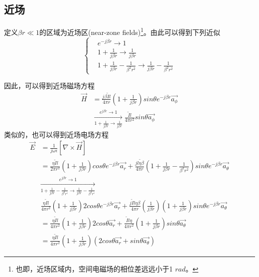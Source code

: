 \documentclass[lang=cn,11pt]{elegantpaper}
\begin{document}
\subsection{近场}
定义$\beta r \ll 1$的区域为近场区(near-zone fields)\footnote{也即，近场区域内，空间电磁场的相位差远远小于1 $rad$。}。由此可以得到下列近似
\begin{equation}
  \left\{\begin{aligned}
    & e^{-j\beta r}\rightarrow 1 \\
    & 1 + \frac{1}{j\beta r} \rightarrow \frac{1}{j\beta r} \\
    & 1 + \frac{1}{j\beta r} - \frac{1}{{\beta}^2 r^2} \rightarrow \frac{1}{j\beta r} - \frac{1}{{\beta}^2 r^2}
  \end{aligned}\right.
\end{equation}

因此，可以得到近场磁场方程
\begin{equation}
  \begin{aligned}
    \vec{H} &= \frac{j\beta \widetilde{I}l}{4\pi r}\left(1 + \frac{1}{j\beta r}\right)sin \theta {} e^{-j\beta r} \vec{a_{\phi}} \\
    &\xrightarrow[1 + \frac{1}{j\beta r}\rightarrow \frac{1}{j\beta r}]{e^{j\beta r}\rightarrow 1} \frac{\widetilde{I}l}{4\pi r^2}sin \theta \vec{a_{\phi}} 
  \end{aligned}
\end{equation}
类似的，也可以得到近场电场方程
\begin{equation}
  \begin{aligned}
    \vec{E} &= \frac{1}{j\omega \epsilon}\left[\nabla \times \vec{H}\right] \\
    &= \frac{\eta \widetilde{I}l}{2\pi r^2}\left(1 + \frac{1}{j\beta r} \right)cos\theta e^{-j\beta r}\vec{a_r}+\frac{j\widetilde{l\eta \beta}}{4\pi r}\left(1+\frac{1}{j\beta r} - \frac{1}{{\beta}^2r^2}\right)sin\theta e^{-j\beta r}\vec{a_{\theta}} \\
    &\xrightarrow[1 + \frac{1}{j\beta r} -\frac{1}{{\beta}^2r^r}\rightarrow \frac{1}{j\beta r}-\frac{1}{{\beta}^2r^r}]{e^{j\beta r}\rightarrow 1} \\
    & \frac{\eta \widetilde{I}l}{4\pi r^2}\left(1+\frac{1}{j\beta r}\right)2cos\theta e^{-j\beta r}\vec{a_r}+\frac{j\widetilde{I}l\eta \beta}{4\pi r}\left(\frac{1}{j\beta r}\right)\left( 1+\frac{1}{j\beta r}\right)sin\theta e^{-j\beta r}\vec{a_{\theta}}\\
    &= \frac{\eta \widetilde{I}l}{4\pi r^2}\left(1+\frac{1}{j\beta r}\right)2cos\theta \vec{a_r} +\frac{\widetilde{I}l\eta}{4\pi r^2}\left( 1+\frac{1}{j\beta r}\right)sin\theta \vec{a_{\theta}} \\
    &= \frac{\eta \widetilde{I}l}{4\pi r^2}\left(1+\frac{1}{j\beta r}\right)\left(2cos\theta \vec{a_r} + sin\theta \vec{a_{\theta}}\right)
  \end{aligned}
\end{equation}
\end{document}
